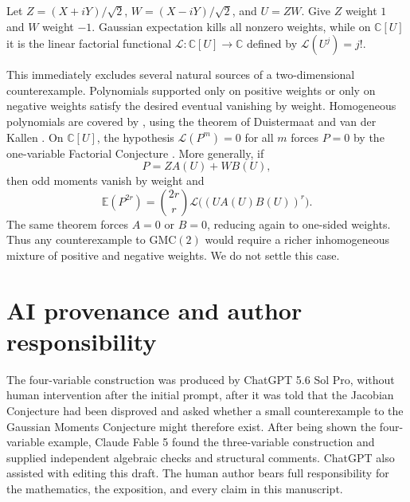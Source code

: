 \documentclass[11pt]{article}
\newcommand{\C}{\mathbb C}
\newcommand{\E}{\mathbb E}
\newcommand{\GMC}{\mathrm{GMC}}
\theoremstyle{remark}
\begin{document}
Let $Z=(X+iY)/\sqrt2$, $W=(X-iY)/\sqrt2$, and $U=ZW$.  Give $Z$ weight $1$ and $W$ weight $-1$.  Gaussian expectation kills all nonzero weights, while on $\C[U]$ it is the linear factorial functional $\mathcal L:\C[U]\to\C$ defined by $\mathcal L(U^j)=j!$.

This immediately excludes several natural sources of a two-dimensional counterexample.  Polynomials supported only on positive weights or only on negative weights satisfy the desired eventual vanishing by weight.  Homogeneous polynomials are covered by \cite[Corollary~4.4]{DVEZ}, using the theorem of Duistermaat and van der Kallen \cite{DvK}.  On $\C[U]$, the hypothesis $\mathcal L(P^m)=0$ for all $m$ forces $P=0$ by the one-variable Factorial Conjecture \cite[Theorem~4.9]{VEWZ}.  More generally, if
\[
  P=ZA(U)+WB(U),
\]
then odd moments vanish by weight and
\[
  \E(P^{2r})=\binom{2r}{r}\mathcal L\bigl((UA(U)B(U))^r\bigr).
\]
The same theorem forces $A=0$ or $B=0$, reducing again to one-sided weights.  Thus any counterexample to $\GMC(2)$ would require a richer inhomogeneous mixture of positive and negative weights.  We do not settle this case.

\section*{AI provenance and author responsibility}

The four-variable construction was produced by ChatGPT 5.6 Sol Pro, without human intervention after the initial prompt, after it was told that the Jacobian Conjecture had been disproved and asked whether a small counterexample to the Gaussian Moments Conjecture might therefore exist.  After being shown the four-variable example, Claude Fable 5 found the three-variable construction and supplied independent algebraic checks and structural comments.  ChatGPT also assisted with editing this draft.  The human author bears full responsibility for the mathematics, the exposition, and every claim in this manuscript.
\end{document}

